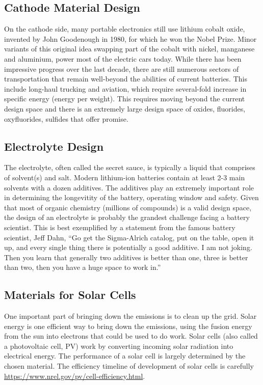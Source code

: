\documentclass[book.tex]{subfiles}
\begin{document}
\subsection{Cathode Material Design}
On the cathode side, many portable electronics still use lithium cobalt oxide, invented by John Goodenough in 1980, for which he won the Nobel Prize.  Minor variants of this original idea swapping part of the cobalt with nickel, manganese and aluminium, power most of the electric cars today.  While there has been impressive progress over the last decade, there are still numerous sectors of transportation that remain well-beyond the abilities of current batteries.  This include long-haul trucking and aviation, which require several-fold increase in specific energy (energy per weight).  This requires moving beyond the current design space and there is an extremely large design space of oxides, fluorides, oxyfluorides, sulfides that offer promise.  

\subsection{Electrolyte Design}
The electrolyte, often called the secret sauce, is typically a liquid that comprises of solvent(s) and salt.  Modern lithium-ion batteries contain at least 2-3 main solvents with a dozen additives.  The additives play an extremely important role in determining the longevitity of the battery, operating window and safety.  Given that most of organic chemistry (millions of compounds) is a valid design space, the design of an electrolyte is probably the grandest challenge facing a battery scientist.  This is best exemplified by a statement from the famous battery scientist, Jeff Dahn, ``Go get the Sigma-Alrich catalog, put on the table, open it up, and every single thing there is potentially a good additive. I am not joking. Then you learn that generally two additives is better than one, three is better than two, then you have a huge space to work in.'' 


\subsection{Materials for Solar Cells}
One important part of bringing down the emissions is to clean up the grid.  Solar energy is one efficient way to bring down the emissions, using the fusion energy from the sun into electrons that could be used to do work.  Solar cells (also called a photovoltaic cell, PV) work by converting incoming solar radiation into electrical energy.   The performance of a solar cell is largely determined by the chosen material.  The efficiency timeline of development of solar cells is carefully \href{curated by National Renewable Energy Laboratory (NREL)}{https://www.nrel.gov/pv/cell-efficiency.html}.
\end{document}
